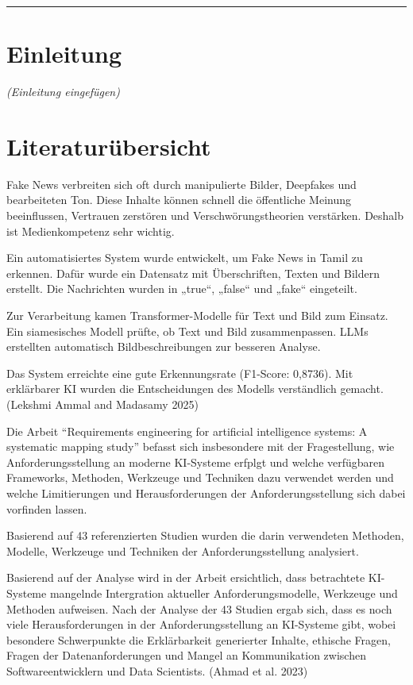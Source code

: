 \documentclass[
  12pt,
  a4paper,
]{article}
\begin{document}
\begin{center}\rule{0.5\linewidth}{0.5pt}\end{center}

\section{Einleitung}\label{einleitung}

\emph{(Einleitung eingefügen)}

\section{Literaturübersicht}\label{literaturuxfcbersicht}

Fake News verbreiten sich oft durch manipulierte Bilder, Deepfakes und
bearbeiteten Ton. Diese Inhalte können schnell die öffentliche Meinung
beeinflussen, Vertrauen zerstören und Verschwörungstheorien verstärken.
Deshalb ist Medienkompetenz sehr wichtig.

Ein automatisiertes System wurde entwickelt, um Fake News in Tamil zu
erkennen. Dafür wurde ein Datensatz mit Überschriften, Texten und
Bildern erstellt. Die Nachrichten wurden in „true``, „false`` und
„fake`` eingeteilt.

Zur Verarbeitung kamen Transformer-Modelle für Text und Bild zum
Einsatz. Ein siamesisches Modell prüfte, ob Text und Bild
zusammenpassen. LLMs erstellten automatisch Bildbeschreibungen zur
besseren Analyse.

Das System erreichte eine gute Erkennungsrate (F1-Score: 0,8736). Mit
erklärbarer KI wurden die Entscheidungen des Modells verständlich
gemacht. (Lekshmi Ammal and Madasamy 2025)

Die Arbeit ``Requirements engineering for artificial intelligence
systems: A systematic mapping study'' befasst sich insbesondere mit der
Fragestellung, wie Anforderungsstellung an moderne KI-Systeme erfplgt
und welche verfügbaren Frameworks, Methoden, Werkzeuge und Techniken
dazu verwendet werden und welche Limitierungen und Herausforderungen der
Anforderungsstellung sich dabei vorfinden lassen.

Basierend auf 43 referenzierten Studien wurden die darin verwendeten
Methoden, Modelle, Werkzeuge und Techniken der Anforderungsstellung
analysiert.

Basierend auf der Analyse wird in der Arbeit ersichtlich, dass
betrachtete KI-Systeme mangelnde Intergration aktueller
Anforderungsmodelle, Werkzeuge und Methoden aufweisen. Nach der Analyse
der 43 Studien ergab sich, dass es noch viele Herausforderungen in der
Anforderungsstellung an KI-Systeme gibt, wobei besondere Schwerpunkte
die Erklärbarkeit generierter Inhalte, ethische Fragen, Fragen der
Datenanforderungen und Mangel an Kommunikation zwischen
Softwareentwicklern und Data Scientists. (Ahmad et al. 2023)
\end{document}
